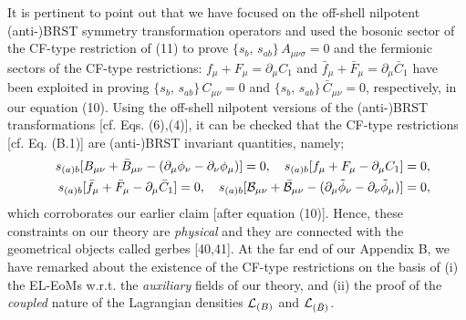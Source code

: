 \documentclass[12pt]{article}
\begin{document}
It is pertinent to point out that we have focused on the off-shell nilpotent (anti-)BRST symmetry transformation operators
and used the bosonic sector of the CF-type restriction of (11) to prove $\{s_b, \,s_{ab}\}\, A_{\mu\nu\sigma} = 0 $ and the fermionic sectors
of the CF-type restrictions: $f_\mu + F_\mu  = \partial_\mu C_1$ and $ \bar f_\mu + \bar F_\mu  = \partial_\mu \bar C_1 $ have been
exploited in proving $\{s_b, \,s_{ab}\}\, C_{\mu\nu} = 0 $ and $\{s_b, \, s_{ab}\}\,\bar C_{\mu\nu} = 0 $, respectively, in our equation (10).
Using the off-shell nilpotent versions of the (anti-)BRST transformations [cf. Eqs. (6),(4)], it can be checked that the CF-type restrictions [cf. Eq. (B.1)]
are (anti-)BRST invariant quantities, namely; 
\begin{eqnarray}\label{12}
&&s_{(a)b}[B_{\mu\nu} + \bar B_{\mu\nu} - (\partial_\mu \phi_\nu  - \partial_\nu \phi_\mu)] = 0, \quad 
s_{(a)b}[f_\mu + F_\mu  - \partial_\mu C_1] = 0,\nonumber\\
&& s_{(a)b}[\bar f_\mu + \bar F_\mu  - \partial_\mu \bar C_1] = 0, \quad 
s_{(a)b}[{\cal B}_{\mu\nu} + \bar {\cal B}_{\mu\nu} - (\partial_\mu \tilde \phi_\nu  - \partial_\nu \tilde \phi_\mu)] = 0,
\end{eqnarray} 
which corroborates our earlier claim [after equation (10)].
Hence, these constraints on our theory are {\it physical} and they are connected with the geometrical objects called gerbes [40,41]. At the far end of
our Appendix B, we have remarked about 
the existence of the CF-type restrictions on the basis of (i) the EL-EoMs w.r.t. the {\it auxiliary} fields of our
theory, and (ii) the proof of the {\it coupled} nature of the Lagrangian densities ${\cal L}_{(B)} $ and ${\cal L}_{(\bar B)} $. 
\end{document}
